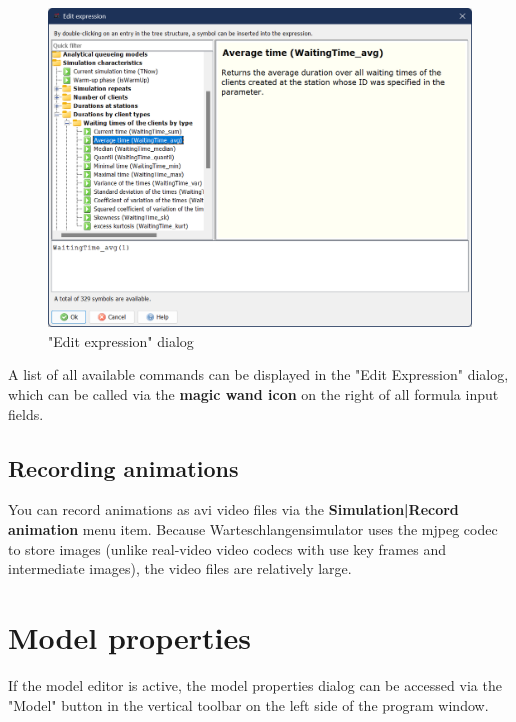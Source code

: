 \documentclass{svmono}
\begin{document}
\begin{figure}[H]	
	\caption{"Edit expression" dialog}
	\centerline{\includegraphics[width=14cm]{DialogExpressionBuilder.png}}
	\label{fig:DialogExpressionBuilder}
\end{figure} 

A list of all available commands can be displayed in the "Edit Expression" dialog, which can be called via the \textbf{magic wand icon} on the right of all formula input fields.

\section{Recording animations}

You can record animations as avi video files via the \textbf{Simulation|Record animation} menu item. Because Warteschlangensimulator uses the mjpeg codec to store images (unlike real-video video codecs with use key frames and intermediate images), the video files are relatively large.



\chapter{Model properties}

If the model editor is active, the model properties dialog can be accessed via the "Model" button in the vertical toolbar on the left side of the program window.
 
\end{document}
